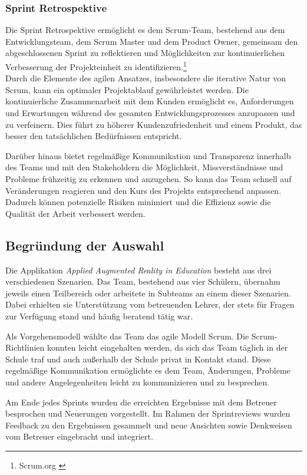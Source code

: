 \subsubsection*{Sprint Retrospektive}
Die Sprint Retrospektive ermöglicht es dem Scrum-Team, bestehend aus dem Entwicklungsteam, dem Scrum Master und dem Product
Owner, gemeinsam den abgeschlossenen Sprint zu reflektieren und Möglichkeiten zur kontinuierlichen Verbesserung der Projekteinheit zu
identifizieren.\footnote{Scrum.org \cite{What is a Sprint Retrospective}}
\\

Durch die Elemente des agilen Ansatzes, insbesondere die iterative Natur von Scrum, kann ein optimaler Projektablauf
gewährleistet werden. Die kontinuierliche Zusammenarbeit mit dem Kunden ermöglicht es, Anforderungen und Erwartungen
während des gesamten Entwicklungsprozesses anzupassen und zu verfeinern. Dies führt zu höherer Kundenzufriedenheit und
einem Produkt, das besser den tatsächlichen Bedürfnissen entspricht.

Darüber hinaus bietet regelmäßige Kommunikation und Transparenz innerhalb des Teams und mit den Stakeholdern die Möglichkeit,
Missverständnisse und Probleme frühzeitig zu erkennen und anzugehen. So kann das Team schnell auf Veränderungen reagieren
und den Kurs des Projekts entsprechend anpassen. Dadurch können potenzielle Risiken minimiert und die Effizienz sowie
die Qualität der Arbeit verbessert werden.

\subsection{Begründung der Auswahl}
Die Applikation \textit{Applied Augmented Reality in Education} besteht aus drei verschiedenen Szenarien. Das Team,
bestehend aus vier Schülern, übernahm jeweils einen Teilbereich oder arbeitete in Subteams an einem dieser Szenarien. Dabei
erhielten sie Unterstützung vom betreuenden Lehrer, der stets für Fragen zur Verfügung stand und häufig beratend tätig war.

Als Vorgehensmodell wählte das Team das agile Modell Scrum. Die Scrum-Richtlinien konnten leicht eingehalten werden, da
sich das Team täglich in der Schule traf und auch außerhalb der Schule privat in Kontakt stand. Diese regelmäßige Kommunikation
ermöglichte es dem Team, Änderungen, Probleme und andere Angelegenheiten leicht zu kommunizieren und zu besprechen.

Am Ende jedes Sprints wurden die erreichten Ergebnisse mit dem Betreuer besprochen und Neuerungen vorgestellt. Im Rahmen
der Sprintreviews wurden Feedback zu den Ergebnissen gesammelt und neue Ansichten sowie Denkweisen vom Betreuer eingebracht
und integriert.

